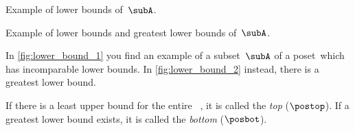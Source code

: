 \begin{solution}
    \begin{marginfigure}
        \centering
        \caption{
            Example of lower bounds of~$\subA$.
        }
        \label{fig:lower_bound_1}
    \end{marginfigure}

    \begin{marginfigure}
        \centering
        \caption{
            Example of lower bounds and greatest lower bounds of~$\subA$.
        }
        \label{fig:lower_bound_2}
    \end{marginfigure}

    In \cref{fig:lower_bound_1} you find an example of a subset~$\subA$ of a poset~\posA which has incomparable lower bounds.
    In \cref{fig:lower_bound_2} instead, there is a greatest lower bound.
\end{solution}

\begin{definition}
    \label{def:top}
    \label{def:bot}
    If there is a least upper bound for the entire ~\posA, it is called the \emph{top} ($\postop$).
    If a greatest lower bound exists, it is called the \emph{bottom} ($\posbot$).
\end{definition}
